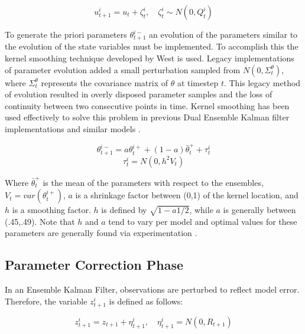 \documentclass[utf8]{frontiersSCNS} %
\begin{document}
\begin{equation}\label{eq:dekf_u}
u_{t+1}^{i} = u_{t} + \zeta_{t}^{i}, \quad \zeta_{t}^{i} \sim N(0,Q_{t}^{i}) 
\end{equation}

To generate the priori parameters $\theta^{i-}_{t+1}$ an evolution of the parameters similar to the evolution of the state variables must be implemented. To accomplish this the kernel smoothing technique developed by West\cite{West1993} is used. Legacy implementations of parameter evolution added a small perturbation sampled from $N(0,\Sigma^{\theta}_{t})$, where $\Sigma^{\theta}_{t}$ represents the covariance matrix of $\theta$ at timestep $t$. This legacy method of evolution resulted in overly disposed parameter samples and the loss of continuity between two consecutive points in time\cite{Chen2008}. Kernel smoothing has been used effectively to solve this problem in previous Dual Ensemble Kalman filter implementations \cite{Moradkhani2005} and similar models \cite{Chen2008}.

\begin{equation}\label{eq:dekf_thetaminus}
\theta_{t+1}^{i-} = a\theta_{t}^{i+} + (1-a)\bar{\theta}_{t}^{+} + \tau_{t}^{i}
\end{equation}
\begin{equation}\label{eq:dekf_tau}
\tau_{t}^{i} = N(0, h^{2}V_{t})
\end{equation}
 
Where $\bar{\theta}_{t}^{+}$ is the mean of the parameters with respect to the ensembles, $V_{t} = var(\theta_{t}^{i+})$, $a$ is a shrinkage factor between (0,1) of the kernel location, and $h$ is a smoothing factor. $h$ is defined by $\sqrt{1-a1/2}$, while $a$ is generally between (.45,.49). Note that $h$ and $a$ tend to vary per model and optimal values for these parameters are generally found via experimentation  \cite{Moradkhani2005}  \cite{Anderson1999} \cite{Annan2005} \cite{Chen2008}.

\subsection{Parameter Correction Phase}

In an Ensemble Kalman Filter, observations are perturbed to reflect model error. Therefore, the variable $z_{t+1}^{i}$ is defined as follows:

\begin{equation}\label{eq:dekf_obs}
z_{t+1}^{i} = z_{t+1} + \eta_{t+1}^{i},\quad \eta_{t+1}^{i} = N(0,R_{t+1})
\end{equation}
\end{document}
